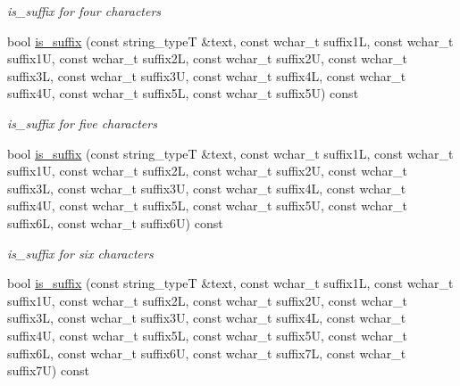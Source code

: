 \begin{DoxyCompactItemize}
\begin{DoxyCompactList}\small\item\em is\-\_\-suffix for four characters \end{DoxyCompactList}\item 
\hypertarget{group___stemming_ga001757aa7530b8acea05df8405def025}{bool \hyperlink{group___stemming_ga001757aa7530b8acea05df8405def025}{is\-\_\-suffix} (const string\-\_\-type\-T \&text, const wchar\-\_\-t suffix1\-L, const wchar\-\_\-t suffix1\-U, const wchar\-\_\-t suffix2\-L, const wchar\-\_\-t suffix2\-U, const wchar\-\_\-t suffix3\-L, const wchar\-\_\-t suffix3\-U, const wchar\-\_\-t suffix4\-L, const wchar\-\_\-t suffix4\-U, const wchar\-\_\-t suffix5\-L, const wchar\-\_\-t suffix5\-U) const }\label{group___stemming_ga001757aa7530b8acea05df8405def025}

\begin{DoxyCompactList}\small\item\em is\-\_\-suffix for five characters \end{DoxyCompactList}\item 
\hypertarget{group___stemming_gabe83f7592028b43f5cec9ce35ae1d9df}{bool \hyperlink{group___stemming_gabe83f7592028b43f5cec9ce35ae1d9df}{is\-\_\-suffix} (const string\-\_\-type\-T \&text, const wchar\-\_\-t suffix1\-L, const wchar\-\_\-t suffix1\-U, const wchar\-\_\-t suffix2\-L, const wchar\-\_\-t suffix2\-U, const wchar\-\_\-t suffix3\-L, const wchar\-\_\-t suffix3\-U, const wchar\-\_\-t suffix4\-L, const wchar\-\_\-t suffix4\-U, const wchar\-\_\-t suffix5\-L, const wchar\-\_\-t suffix5\-U, const wchar\-\_\-t suffix6\-L, const wchar\-\_\-t suffix6\-U) const }\label{group___stemming_gabe83f7592028b43f5cec9ce35ae1d9df}

\begin{DoxyCompactList}\small\item\em is\-\_\-suffix for six characters \end{DoxyCompactList}\item 
\hypertarget{group___stemming_ga79f18e256337d37054c80de470660a65}{bool \hyperlink{group___stemming_ga79f18e256337d37054c80de470660a65}{is\-\_\-suffix} (const string\-\_\-type\-T \&text, const wchar\-\_\-t suffix1\-L, const wchar\-\_\-t suffix1\-U, const wchar\-\_\-t suffix2\-L, const wchar\-\_\-t suffix2\-U, const wchar\-\_\-t suffix3\-L, const wchar\-\_\-t suffix3\-U, const wchar\-\_\-t suffix4\-L, const wchar\-\_\-t suffix4\-U, const wchar\-\_\-t suffix5\-L, const wchar\-\_\-t suffix5\-U, const wchar\-\_\-t suffix6\-L, const wchar\-\_\-t suffix6\-U, const wchar\-\_\-t suffix7\-L, const wchar\-\_\-t suffix7\-U) const }\label{group___stemming_ga79f18e256337d37054c80de470660a65}


\end{DoxyCompactItemize}
